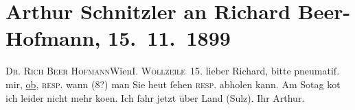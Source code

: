 

         
         \renewcommand{\erwaehntePersonen}{Personen: Richard Beer-Hofmann}
         \renewcommand{\erwaehnteOrte}{Orte: I., Innere Stadt, IX., Alsergrund, Sulz im Wienerwald, Wien, Wollzeile}
         \renewcommand{\erwaehnteWerke}{}
               \section[Arthur Schnitzler an Richard Beer-Hofmann, 15. 11. 1899]{ Arthur Schnitzler an Richard Beer-Hofmann, 15. 11. 1899}\nopagebreak{}\rehead{ }\begin{ledgroupsized}[t]{13cm}\normalsize\beginnumbering \toendnotes[C]{\smallbreak\pagebreak[2]} 
\pstart{}{\pb}\textsc{Dr. Rich Beer Hofmann}\pend{}\pstart{}Wien\pend{}\pstart{}\textsc{I. Wollzeile 15}.\pend{}{\bigskip}\pstart
           \noindent{}{\pb}lieber Richard, bitte pneumatiſ. mir, \uline{ob}, \textsc{resp}. wann (8?) man Sie heut
               ſehen \textsc{resp}. abholen kann. Am So{\geminationn}tag ko{\geminationn}t ich
               leider nicht mehr ko{\geminationm}en.\pend
           \pstart
           Ich fahr jetzt über Land \introOben{}(Sulz)\introOben{}.\pend
           \pstart Ihr \spacefill\mbox{Arthur.}\pend{}
         
         \endnumbering{}\end{ledgroupsized}  \newcommand{\dateiname}{L00994}\newcommand{\titel}{Arthur Schnitzler an Richard Beer-Hofmann, 15. 11. 1899}\newcommand{\editorInnen}{Martin Anton Müller und Gerd-Hermann Susen}
      